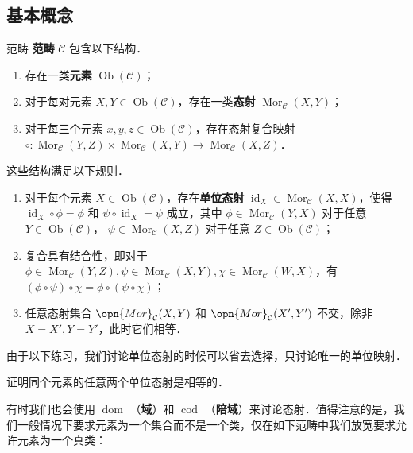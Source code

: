 
\subsection{基本概念}
\begin{definition}{范畴}
\textbf{范畴} $\mathcal{C}$ 包含以下结构．
\begin{enumerate}
    \item 存在一类\textbf{元素} $\operatorname{Ob}(\mathcal{C})$；
    \item 对于每对元素 $X,Y\in\operatorname{Ob}(\mathcal{C})$，存在一类\textbf{态射} $\operatorname{Mor}_\mathcal{C}(X,Y)$；
    \item 对于每三个元素 $x,y,z\in\operatorname{Ob}(\mathcal{C})$，存在态射复合映射 ${\circ}:\operatorname{Mor}_\mathcal{C}(Y,Z)\times\operatorname{Mor}_{\mathcal{C}}(X,Y)\to\operatorname{Mor}_\mathcal{C}(X,Z)$．
\end{enumerate}
这些结构满足以下规则．
\begin{enumerate}
    \item 对于每个元素 $X\in\operatorname{Ob}(\mathcal{C})$，存在\textbf{单位态射} $\operatorname{id}_X\in\operatorname{Mor}_\mathcal{C}(X,X)$，使得 $\operatorname{id}_X\circ\phi=\phi$ 和 $\psi\circ\operatorname{id}_X=\psi$ 成立，其中 $\phi\in\operatorname{Mor}_\mathcal{C}(Y,X)$ 对于任意 $Y\in\operatorname{Ob}(\mathcal{C})$， $\psi\in\operatorname{Mor}_\mathcal{C}(X,Z)$ 对于任意 $Z\in\operatorname{Ob}(\mathcal{C})$；
    \item 复合具有结合性，即对于 $\phi\in\operatorname{Mor}_\mathcal{C}(Y,Z),\psi\in\operatorname{Mor}_\mathcal{C}(X,Y),\chi\in\operatorname{Mor}_\mathcal{C}(W,X)$，有 $(\phi\circ\psi)\circ\chi=\phi\circ(\psi\circ\chi)$；
    \item 任意态射集合 $\opn{Mor}_\mathcal{C}(X,Y)$ 和 $\opn{Mor}_\mathcal{C}(X',Y')$ 不交，除非 $X=X',Y=Y'$，此时它们相等．
\end{enumerate}
\end{definition}
由于以下练习，我们讨论单位态射的时候可以省去选择，只讨论唯一的单位映射．
\begin{exercise}{}
证明同个元素的任意两个单位态射是相等的．
\end{exercise}
有时我们也会使用 $\operatorname{dom}$ （\textbf{域}）和 $\operatorname{cod}$ （\textbf{陪域}）来讨论态射．值得注意的是，我们一般情况下要求元素为一个集合而不是一个类，仅在如下范畴中我们放宽要求允许元素为一个真类：
